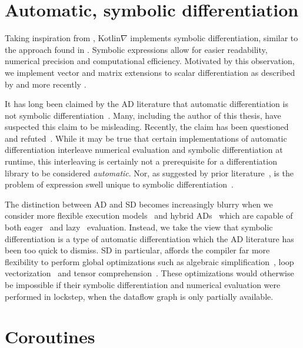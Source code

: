 \section{Automatic, symbolic differentiation}\label{sec:ad_vs_sd}

Taking inspiration from \citet{mccarthy1960recursive}, Kotlin$\nabla$ implements symbolic differentiation, similar to the approach found in \citet[\S 2.56--2.58]{abelson1996structure}. Symbolic expressions allow for easier readability, numerical precision and computational efficiency. Motivated by this observation, we implement vector and matrix extensions to scalar differentiation as described by \citet{dwyer1948symbolic} and more recently \citet{laue2018computing}.

It has long been claimed by the AD literature that automatic differentiation is not symbolic differentiation~\citep{baydin2015survey}. Many, including the author of this thesis, have suspected this claim to be misleading. Recently, the claim has been questioned~\citep{wang2018demystifying} and refuted~\citep{laue2019equivalence}. While it may be true that certain implementations of automatic differentiation interleave numerical evaluation and symbolic differentiation at runtime, this interleaving is certainly not a prerequisite for a differentiation library to be considered \textit{automatic}. Nor, as suggested by prior literature~\citep{baydin2014ad}, is the problem of expression swell unique to symbolic differentiation~\citep{laue2019equivalence}.

The distinction between AD and SD becomes increasingly blurry when we consider more flexible execution models~\citep{wang2018demystifying} and hybrid ADs~\citep{abadi2016tensorflow} which are capable of both eager~\citep{paszke2019pytorch, agrawal2019tensorflow} and lazy~\citep{neubig2017dynet, van2018tangent} evaluation. Instead, we take the view that symbolic differentiation is a type of automatic differentiation which the AD literature has been too quick to dismiss. SD in particular, affords the compiler far more flexibility to perform global optimizations such as algebraic simplification~\citep{bergstra2010theano}, loop vectorization~\citep{agarwal2019static} and tensor comprehension~\citep{vasilache2018tensor, laue2020simple}. These optimizations would otherwise be impossible if their symbolic differentiation and numerical evaluation were performed in lockstep, when the dataflow graph is only partially available.

\section{Coroutines}\label{sec:coroutines}


